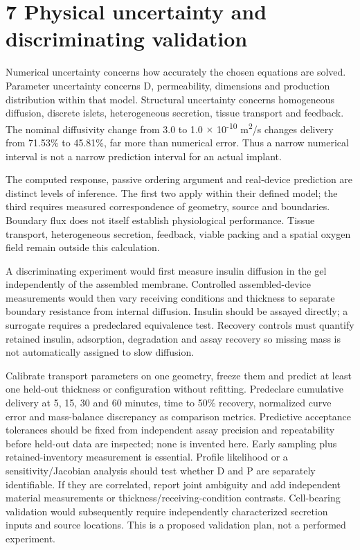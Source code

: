 \documentclass[11pt]{article}
\begin{document}
\section*{7 Physical uncertainty and discriminating validation}
Numerical uncertainty concerns how accurately the chosen equations are solved. Parameter uncertainty concerns D, permeability, dimensions and production distribution within that model. Structural uncertainty concerns homogeneous diffusion, discrete islets, heterogeneous secretion, tissue transport and feedback. The nominal diffusivity change from 3.0 to 1.0 \ensuremath{\times} 10\textsuperscript{-}\textsuperscript{1}\textsuperscript{0} m\textsuperscript{2}/s changes delivery from 71.53\% to 45.81\%, far more than numerical error. Thus a narrow numerical interval is not a narrow prediction interval for an actual implant.

The computed response, passive ordering argument and real-device prediction are distinct levels of inference. The first two apply within their defined model; the third requires measured correspondence of geometry, source and boundaries. Boundary flux does not itself establish physiological performance. Tissue transport, heterogeneous secretion, feedback, viable packing and a spatial oxygen field remain outside this calculation.

A discriminating experiment would first measure insulin diffusion in the gel independently of the assembled membrane. Controlled assembled-device measurements would then vary receiving conditions and thickness to separate boundary resistance from internal diffusion. Insulin should be assayed directly; a surrogate requires a predeclared equivalence test. Recovery controls must quantify retained insulin, adsorption, degradation and assay recovery so missing mass is not automatically assigned to slow diffusion.

Calibrate transport parameters on one geometry, freeze them and predict at least one held-out thickness or configuration without refitting. Predeclare cumulative delivery at 5, 15, 30 and 60 minutes, time to 50\% recovery, normalized curve error and mass-balance discrepancy as comparison metrics. Predictive acceptance tolerances should be fixed from independent assay precision and repeatability before held-out data are inspected; none is invented here. Early sampling plus retained-inventory measurement is essential. Profile likelihood or a sensitivity/Jacobian analysis should test whether D and P are separately identifiable. If they are correlated, report joint ambiguity and add independent material measurements or thickness/receiving-condition contrasts. Cell-bearing validation would subsequently require independently characterized secretion inputs and source locations. This is a proposed validation plan, not a performed experiment.
\end{document}
